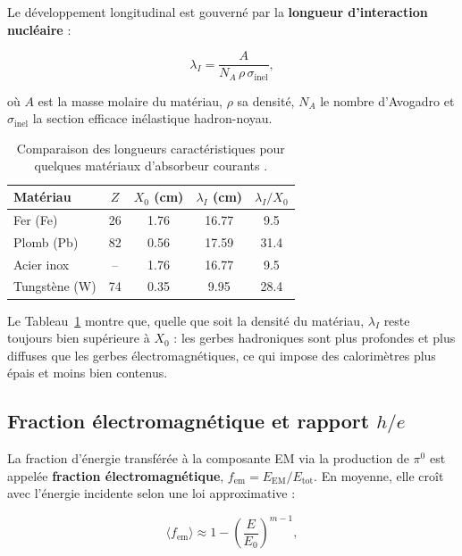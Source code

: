 Le développement longitudinal est gouverné par la \textbf{longueur d'interaction
nucléaire} \cite{pdg2024} :

\begin{equation}
\lambda_I = \frac{A}{N_A\,\rho\,\sigma_{\mathrm{inel}}},
\label{eq:lambda-i}
\end{equation}

où $A$ est la masse molaire du matériau, $\rho$ sa densité, $N_A$ le nombre d'Avogadro et
$\sigma_{\mathrm{inel}}$ la section efficace inélastique hadron-noyau.

\begin{table}[!ht]
    \centering
    \caption{Comparaison des longueurs caractéristiques pour quelques matériaux d'absorbeur
             courants \cite{pdg2024}.}
    \label{tab:longueurs-carac}
    \begin{tabular}{lcccc}
        \hline
        \textbf{Matériau} & $Z$ & $X_0$ (cm) & $\lambda_I$ (cm) & $\lambda_I / X_0$ \\
        \hline
        Fer (Fe)      & 26 & 1.76  & 16.77 & 9.5  \\
        Plomb (Pb)    & 82 & 0.56  & 17.59 & 31.4 \\
        Acier inox    & -- & 1.76  & 16.77 & 9.5  \\
        Tungstène (W) & 74 & 0.35  & 9.95  & 28.4 \\
        \hline
    \end{tabular}
\end{table}

\noindent Le Tableau~\ref{tab:longueurs-carac} montre que, quelle que soit la densité du matériau,
$\lambda_I$ reste toujours bien supérieure à $X_0$ : les gerbes hadroniques sont plus profondes et
plus diffuses que les gerbes électromagnétiques, ce qui impose des calorimètres plus épais et
moins bien contenus.

\subsection{Fraction électromagnétique et rapport \texorpdfstring{$h/e$}{h/e}}

La fraction d'énergie transférée à la composante EM via la production de $\pi^0$ est appelée
\textbf{fraction électromagnétique}, $f_{\mathrm{em}} = E_{\mathrm{EM}}/E_{\mathrm{tot}}$. En
moyenne, elle croît avec l'énergie incidente selon une loi approximative \cite{wigmans2000} :

\begin{equation}
\langle f_{\mathrm{em}} \rangle \approx 1 - \left(\frac{E}{E_0}\right)^{m-1},
\label{eq:fem}
\end{equation}

